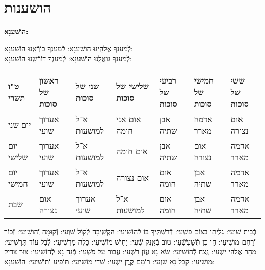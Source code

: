\documentclass[twoside, openany, parskip=half, 11pt]{book}
\begin{document}


\chapter[הושענות]{ הושענות }
\label{hoshanos}


\begin{Large}
\textbf{
הוֹשַׁענָא:
}
\end{Large}


לְֿמַעַנְךָ אֱלֹהֵֽינוּ הוֹשַׁענָא: לְֿמַעַנְךָ בּוֹרְֿאֵֽנוּ הוֹשַׁענָא:\\
לְֿמַעַנְךָ גּוֹאֲלֵֽנוּ הוֹשַׁענָא: לְֿמַעַנְךָ דּוֹרְֿשֵֽׁנוּ הוֹשַׁענָא:

\begin{tiny}
\begin{tabular}{>{\centering\arraybackslash}m{}||>{\centering\arraybackslash}m{}|>{\centering\arraybackslash}m{}|>{\centering\arraybackslash}m{}|>{\centering\arraybackslash}m{}|>{\centering\arraybackslash}m{}|>{\centering\arraybackslash}m{}}
ט"ו תשרי & ראשון של סוכות & שני של סוכות & שלישי של סוכות & רביעי של סוכות & חמישי של סוכות & ששי של סוכות \\
\hline \hline
יום שני & אערוך שועי & א־ל למושעות & אום אני חומה & אבן שתיה & אדמה מארר & אום נצורה\\ \hline
יום שלישי & אערוך שועי & א־ל למושעות & אום חומה & אבן שתיה & אום נצורה & אדמה מארר \\ \hline
יום חמישי & אערוך שועי & א־ל למושעות & אום נצורה & אום חומה & אבן שתיה & אדמה מארר\\ \hline
שבת & אום נצורה & אערוך שועי & א־ל למושעות & אום חומה & אבן שתיה & אדמה מארר
\end{tabular}

\end{tiny}


בְּֿבֵית שַׁוְעִי: גִּלִּֽיתִי בַצּוֹם פִּשְׁעִי: דְּֿרַשְׁתִּֽיךָ בּוֹ לְֿהוֹשִׁיעִי: הַקְשִֽׁיבָה לְֿקוֹל שַׁוְעִי: וְֿקֽוּמָה וְֿהוֹשִׁיעִי: זְֿכוֹר וְֿרַחֵם מוֹשִׁיעִי: חַי כֵּן תְּֿשַׁעְשְֿׁעִי: טוֹב בְּֿאֶֽנֶק שְֿׁעִי: יָחִישׁ מוֹשִׁיעִי: כַּלֵּה מַרְשִׁיעִי: לְֿבַל עוֹד תַּרְשִׁיעִי: מַהֵר אֱלֹהֵי יִשְׁעִי: נֶֽצַח לְֿהוֹשִׁיעִי: שָׂא נָא עֲוֹן רִשְׁעִי: עֲבוֹר עַל פִּשְׁעִי: פְּֿנֵה נָא לְֿהוֹשִׁיעִי: צוּר צַדִּיק מוֹשִׁיעִי: קַבֵּל נָא שַׁוְעִי: רוֹמֵם קֶֽרֶן יִשְׁעִי:
שַׁדַּי מוֹשִׁיעִי: תּוֹפִֽיעַ וְֿתוֹשִׁיעִי: הוֹשַׁענָא:

\end{document}
